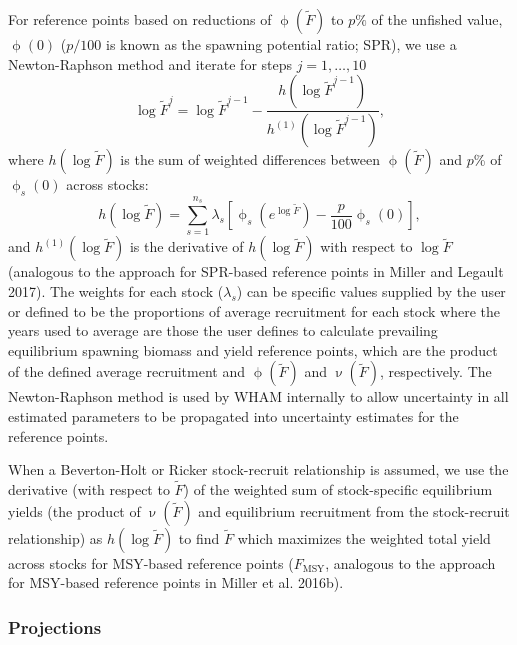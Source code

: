 \documentclass[
]{article}
\begin{document}
For reference points based on reductions of \(\upphi({\widetilde{F}})\) to \(p\%\) of the unfished value, \(\upphi(0)\) (\(p/100\) is known as the spawning potential ratio; SPR), we use a Newton-Raphson method and iterate for steps \(j = 1,\ldots,10\)
\begin{equation}\label{eq:newton}
  \log\widetilde{F}^{j} = \log\widetilde{F}^{j-1} - \frac{h\left(\log\widetilde{F}^{j-1}\right)}{h^{(1)}\left(\log\widetilde{F}^{j-1}\right)},
\end{equation}
where \(h(\log \widetilde{F})\) is the sum of weighted differences between \(\upphi({\widetilde{F}})\) and \(p\)\% of \(\upphi_s\left(0\right)\) across stocks:
\begin{equation}\label{eq:newton-obj}
  h(\log \widetilde{F}) = \sum^{n_s}_{s=1} \lambda_s\left[\upphi_s\left(e^{\log \widetilde{F}}\right) - \frac{p}{100}\upphi_s\left(0\right)\right],
\end{equation}
and \(h^{(1)}(\log \widetilde{F})\) is the derivative of \(h(\log \widetilde{F})\) with respect to \(\log \widetilde{F}\) (analogous to the approach for SPR-based reference points in Miller and Legault 2017). The weights for each stock (\(\lambda_s\)) can be specific values supplied by the user or defined to be the proportions of average recruitment for each stock where the years used to average are those the user defines to calculate prevailing equilibrium spawning biomass and yield reference points, which are the product of the defined average recruitment and \(\upphi({\widetilde{F}})\) and \(\upnu({\widetilde{F}})\), respectively. The Newton-Raphson method is used by WHAM internally to allow uncertainty in all estimated parameters to be propagated into uncertainty estimates for the reference points.

When a Beverton-Holt or Ricker stock-recruit relationship is assumed, we use the derivative (with respect to \(\widetilde{F}\)) of the weighted sum of stock-specific equilibrium yields (the product of \(\upnu({\widetilde{F}})\) and equilibrium recruitment from the stock-recruit relationship) as \(h(\log \widetilde{F})\) to find \(\widetilde{F}\) which maximizes the weighted total yield across stocks for MSY-based reference points (\(F_{\text{MSY}}\), analogous to the approach for MSY-based reference points in Miller et al. 2016b).

\hypertarget{projections}{%
\subsubsection*{Projections}\label{projections}}
\end{document}
